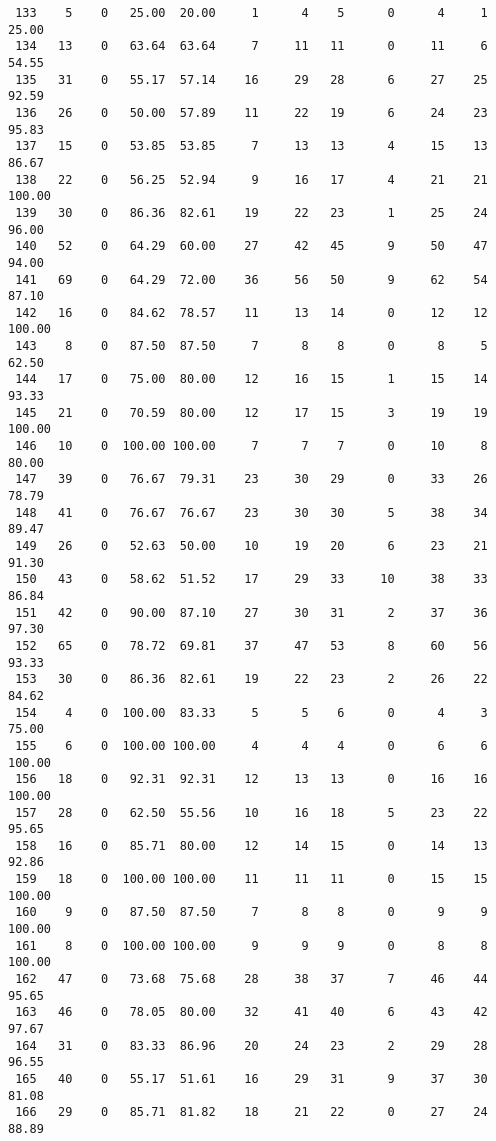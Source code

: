 \begin{verbatim}
 133    5    0   25.00  20.00     1      4    5      0      4     1    25.00
 134   13    0   63.64  63.64     7     11   11      0     11     6    54.55
 135   31    0   55.17  57.14    16     29   28      6     27    25    92.59
 136   26    0   50.00  57.89    11     22   19      6     24    23    95.83
 137   15    0   53.85  53.85     7     13   13      4     15    13    86.67
 138   22    0   56.25  52.94     9     16   17      4     21    21   100.00
 139   30    0   86.36  82.61    19     22   23      1     25    24    96.00
 140   52    0   64.29  60.00    27     42   45      9     50    47    94.00
 141   69    0   64.29  72.00    36     56   50      9     62    54    87.10
 142   16    0   84.62  78.57    11     13   14      0     12    12   100.00
 143    8    0   87.50  87.50     7      8    8      0      8     5    62.50
 144   17    0   75.00  80.00    12     16   15      1     15    14    93.33
 145   21    0   70.59  80.00    12     17   15      3     19    19   100.00
 146   10    0  100.00 100.00     7      7    7      0     10     8    80.00
 147   39    0   76.67  79.31    23     30   29      0     33    26    78.79
 148   41    0   76.67  76.67    23     30   30      5     38    34    89.47
 149   26    0   52.63  50.00    10     19   20      6     23    21    91.30
 150   43    0   58.62  51.52    17     29   33     10     38    33    86.84
 151   42    0   90.00  87.10    27     30   31      2     37    36    97.30
 152   65    0   78.72  69.81    37     47   53      8     60    56    93.33
 153   30    0   86.36  82.61    19     22   23      2     26    22    84.62
 154    4    0  100.00  83.33     5      5    6      0      4     3    75.00
 155    6    0  100.00 100.00     4      4    4      0      6     6   100.00
 156   18    0   92.31  92.31    12     13   13      0     16    16   100.00
 157   28    0   62.50  55.56    10     16   18      5     23    22    95.65
 158   16    0   85.71  80.00    12     14   15      0     14    13    92.86
 159   18    0  100.00 100.00    11     11   11      0     15    15   100.00
 160    9    0   87.50  87.50     7      8    8      0      9     9   100.00
 161    8    0  100.00 100.00     9      9    9      0      8     8   100.00
 162   47    0   73.68  75.68    28     38   37      7     46    44    95.65
 163   46    0   78.05  80.00    32     41   40      6     43    42    97.67
 164   31    0   83.33  86.96    20     24   23      2     29    28    96.55
 165   40    0   55.17  51.61    16     29   31      9     37    30    81.08
 166   29    0   85.71  81.82    18     21   22      0     27    24    88.89

\end{verbatim}

